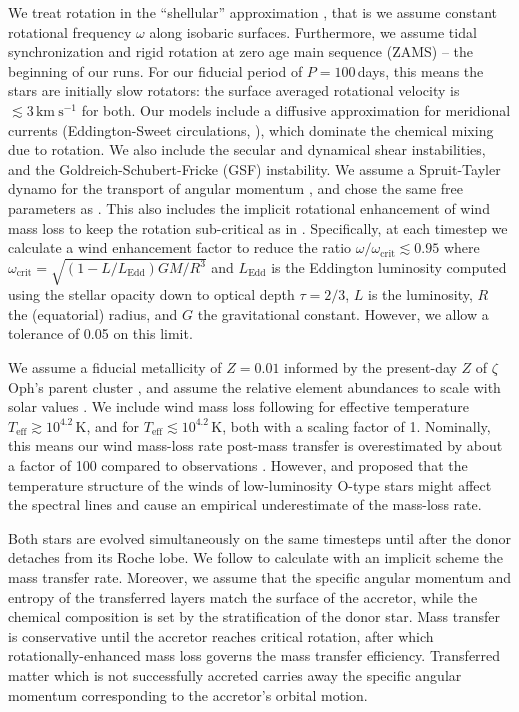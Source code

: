 \documentclass[twocolumn,twocolappendix,trackchanges]{aastex63}
\newcommand{\kms}{{\mathrm{km\ s^{-1}}}}
\newcommand{\zoph}{$\zeta$ Oph}
\begin{document}
We treat rotation in the ``shellular'' approximation
\citep[e.g.,][]{zahn:92, ekstrom:12}, that is we
assume constant rotational frequency $\omega$ along isobaric
surfaces. Furthermore, we assume tidal synchronization and rigid
rotation at zero age
main sequence (ZAMS) -- the beginning of our runs. For our fiducial
period of $P=100$\,days, this means the stars are initially slow
rotators: the surface averaged rotational velocity is
$\lesssim3\,\kms$ for both. Our models include a diffusive
approximation for meridional currents (Eddington-Sweet circulations, \citealt{sweet:50}), which
dominate the chemical mixing due to rotation. We also include the
secular and dynamical shear instabilities, and the
Goldreich-Schubert-Fricke (GSF) instability.  We assume a Spruit-Tayler
dynamo for the transport of angular momentum \citep{spruit:02}, and
chose the same free parameters as \cite{heger:00}. This also includes
the implicit rotational enhancement of wind mass loss to keep the
rotation sub-critical as in \cite{langer:98}. Specifically, at each
timestep we calculate a wind enhancement factor to reduce the ratio
$\omega/\omega_\mathrm{crit}\lesssim 0.95$ where
$\omega_\mathrm{crit}=\sqrt{(1-L/L_\mathrm{Edd})GM/R^3}$ and
$L_\mathrm{Edd}$ is the Eddington luminosity computed using the
stellar opacity down to optical depth
$\tau=2/3$, $L$ is the luminosity, $R$ the (equatorial) radius, and $G$
the gravitational constant. However, we allow a tolerance of 0.05 on
this limit.



We assume a fiducial metallicity of $Z=0.01$ informed by the
present-day $Z$ of \zoph's parent cluster \citep{murphy:21}, and assume
the relative element abundances to scale with solar values \citep{grevesse:98}. We include wind mass loss following
\cite{vink:00,vink:01} for effective
temperature $T_\mathrm{eff}\gtrsim10^{4.2}$\,K, and \cite{dejager:88} for  $T_\mathrm{eff}\lesssim10^{4.2}$\,K, both with a scaling
factor of 1. Nominally, this means our wind mass-loss rate post-mass
transfer is overestimated by about a factor of 100 compared to
observations \citep[weak wind problem, see][]{marcolino:09}.  However,
\cite{lucy:12} and \cite{lagae:21} proposed that the temperature
structure of the winds of low-luminosity O-type stars might affect the
spectral lines and cause an empirical underestimate of the mass-loss
rate.

Both stars are evolved simultaneously on the same timesteps until
after the donor detaches from its Roche lobe. We follow \cite{kolb:90}
to calculate with an implicit scheme the mass transfer rate. Moreover, we
assume that the specific angular momentum and entropy of the
transferred layers match the surface of the accretor, while the chemical composition
is set by the stratification of the donor star. Mass transfer is
conservative until the accretor reaches critical rotation, after which
rotationally-enhanced mass loss governs the mass transfer efficiency.
Transferred matter which is not successfully accreted carries away the
specific angular momentum corresponding to the accretor's orbital
motion.
\end{document}
